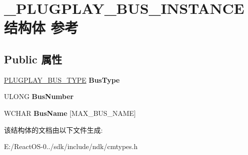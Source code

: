 \hypertarget{struct___p_l_u_g_p_l_a_y___b_u_s___i_n_s_t_a_n_c_e}{}\section{\+\_\+\+P\+L\+U\+G\+P\+L\+A\+Y\+\_\+\+B\+U\+S\+\_\+\+I\+N\+S\+T\+A\+N\+C\+E结构体 参考}
\label{struct___p_l_u_g_p_l_a_y___b_u_s___i_n_s_t_a_n_c_e}
\subsection*{Public 属性}
\begin{DoxyCompactItemize}
\item 
\mbox{\label{struct___p_l_u_g_p_l_a_y___b_u_s___i_n_s_t_a_n_c_e_a0d3922f600c4fe6e638ae683f0712fce}} 
\hyperlink{struct___p_l_u_g_p_l_a_y___b_u_s___t_y_p_e}{P\+L\+U\+G\+P\+L\+A\+Y\+\_\+\+B\+U\+S\+\_\+\+T\+Y\+PE} {\bfseries Bus\+Type}
\item 
\mbox{\label{struct___p_l_u_g_p_l_a_y___b_u_s___i_n_s_t_a_n_c_e_ad0392ca665f669f6705d2c00b2b16b71}} 
U\+L\+O\+NG {\bfseries Bus\+Number}
\item 
\mbox{\label{struct___p_l_u_g_p_l_a_y___b_u_s___i_n_s_t_a_n_c_e_a7e5e253eae88e5fa1e28d77bdbf88db4}} 
W\+C\+H\+AR {\bfseries Bus\+Name} \mbox{[}M\+A\+X\+\_\+\+B\+U\+S\+\_\+\+N\+A\+ME\mbox{]}
\end{DoxyCompactItemize}


该结构体的文档由以下文件生成\+:\begin{DoxyCompactItemize}
\item 
E\+:/\+React\+O\+S-\/0../sdk/include/ndk/cmtypes.\+h\end{DoxyCompactItemize}
